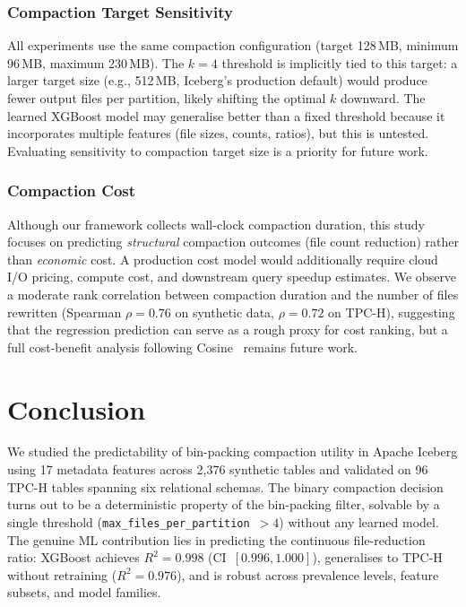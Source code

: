 \documentclass[conference, 10pt]{IEEEtran}
\begin{document}
\subsubsection{Compaction Target Sensitivity}
All experiments use the same compaction configuration (target 128\,MB,
minimum 96\,MB, maximum 230\,MB). The $k{=}4$ threshold is implicitly
tied to this target: a larger target size (e.g., 512\,MB, Iceberg's
production default) would produce fewer output files per partition,
likely shifting the optimal $k$ downward. The learned XGBoost model
may generalise better than a fixed threshold because it incorporates
multiple features (file sizes, counts, ratios), but this is untested.
Evaluating sensitivity to compaction target size is a priority for
future work.

\subsubsection{Compaction Cost}
Although our framework collects wall-clock compaction duration, this
study focuses on predicting \emph{structural} compaction outcomes
(file count reduction) rather than \emph{economic} cost. A
production cost model would additionally require cloud I/O pricing,
compute cost, and downstream query speedup estimates. We observe a
moderate rank correlation between compaction duration and the number
of files rewritten (Spearman $\rho = 0.76$ on synthetic data,
$\rho = 0.72$ on TPC-H), suggesting that the regression prediction
can serve as a rough proxy for cost ranking, but a full cost-benefit
analysis following Cosine~\cite{chatterjee2022cosine} remains future
work.





\section{Conclusion}

We studied the predictability of bin-packing compaction utility in Apache
Iceberg using 17 metadata features across 2{,}376 synthetic tables and validated
on 96 TPC-H tables spanning six relational schemas. The binary compaction
decision turns out to be a deterministic property of the bin-packing
filter, solvable by a single threshold
(\texttt{max\_files\_per\_partition}~$> 4$) without any learned model.
The genuine ML contribution lies in predicting the continuous
file-reduction ratio: XGBoost achieves $R^2 = 0.998$
(CI~$[0.996, 1.000]$), generalises to TPC-H without retraining
($R^2 = 0.976$), and is robust across prevalence levels, feature
subsets, and model families.
\end{document}
